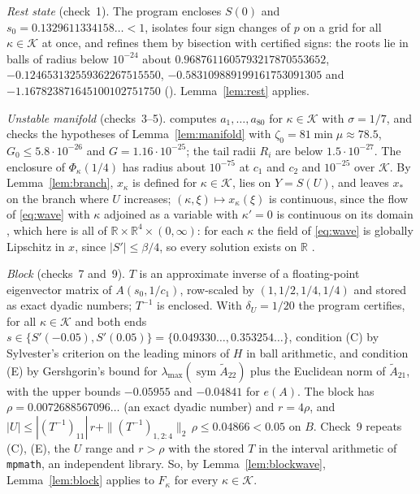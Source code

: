 \documentclass[11pt]{article}
\theoremstyle{definition}
\newcommand{\R}{\mathbb{R}}
\newcommand{\sym}{\operatorname{sym}}
\newcommand{\Kset}{\mathcal{K}}
\newcommand{\xs}{x_*}
\begin{document}
\emph{Rest state} (check~1). The program encloses $S(0)$ and $s_0 = 0.1329611334158\ldots < 1$, isolates four sign changes of $p$ on a grid for all $\kappa \in \Kset$ at once, and refines them by bisection with certified signs: the roots lie in balls of radius below $10^{-24}$ about $0.9687611605\allowbreak 7932178705\allowbreak 53652$, $-0.1246531325\allowbreak 5936226751\allowbreak 5550$, $-0.5831098891\allowbreak 9916175309\allowbreak 1305$ and $-1.1678238716\allowbreak 4510010275\allowbreak 1750$ (). Lemma~\ref{lem:rest} applies.

\emph{Unstable manifold} (checks~3--5).  computes $a_1, \dots, a_{80}$ for $\kappa \in \Kset$ with $\sigma = 1/7$, and checks the hypotheses of Lemma~\ref{lem:manifold} with $\zeta_0 = 81\min\mu \approx 78.5$, $G_0 \le 5.8\cdot 10^{-26}$ and $G = 1.16\cdot 10^{-25}$; the tail radii $R_i$ are below $1.5\cdot 10^{-27}$. The enclosure of $\Phi_\kappa(1/4)$ has radius about $10^{-75}$ at $c_1$ and $c_2$ and $10^{-25}$ over $\Kset$. By Lemma~\ref{lem:branch}, $x_\kappa$ is defined for $\kappa \in \Kset$, lies on $Y = S(U)$, and leaves $\xs$ on the branch where $U$ increases; $(\kappa, \xi) \mapsto x_\kappa(\xi)$ is continuous, since the flow of \eqref{eq:wave} with $\kappa$ adjoined as a variable with $\kappa' = 0$ is continuous on its domain \cite[Theorem~6.1]{teschl2012}, which here is all of $\R \times \R^4 \times (0, \infty)$: for each $\kappa$ the field of \eqref{eq:wave} is globally Lipschitz in $x$, since $|S'| \le \beta/4$, so every solution exists on $\R$ \cite[Theorem~2.17]{teschl2012}.

\emph{Block} (checks~7 and~9). $T$ is an approximate inverse of a floating-point eigenvector matrix of $A(s_0, 1/c_1)$, row-scaled by $(1, 1/2, 1/4, 1/4)$ and stored as exact dyadic numbers; $T^{-1}$ is enclosed. With $\delta_U = 1/20$ the program certifies, for all $\kappa \in \Kset$ and both ends $s \in \{S'(-0.05), S'(0.05)\} = \{0.049330\ldots, 0.353254\ldots\}$, condition (C) by Sylvester's criterion on the leading minors of $H$ in ball arithmetic, and condition (E) by Gershgorin's bound for $\lambda_{\max}(\sym\tilde A_{22})$ plus the Euclidean norm of $\tilde A_{21}$, with the upper bounds $-0.05955$ and $-0.04841$ for $e(A)$. The block has $\rho = 0.0072688567096\ldots$ (an exact dyadic number) and $r = 4\rho$, and $|U| \le |(T^{-1})_{11}|\, r + \|(T^{-1})_{1, 2:4}\|_2\,\rho \le 0.04866 < 0.05$ on $B$. Check~9 repeats (C), (E), the $U$ range and $r > \rho$ with the stored $T$ in the interval arithmetic of \texttt{mpmath}, an independent library. So, by Lemma~\ref{lem:blockwave}, Lemma~\ref{lem:block} applies to $F_\kappa$ for every $\kappa \in \Kset$.
\end{document}
